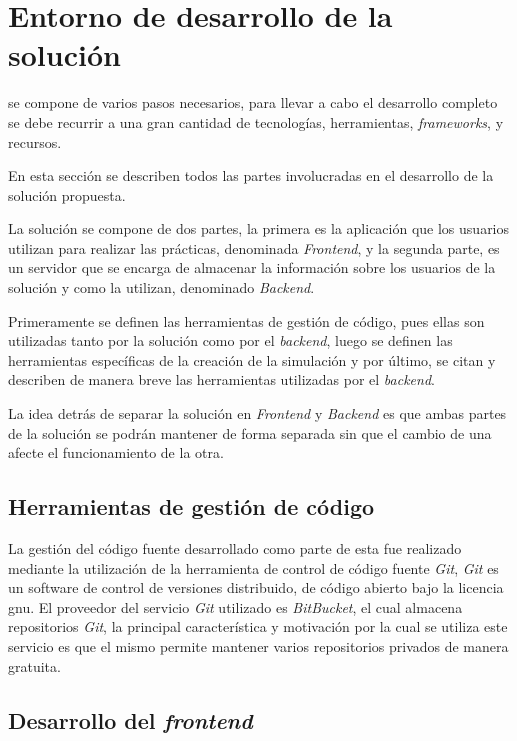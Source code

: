 \section{Entorno de desarrollo de la solución}

 se compone de varios pasos necesarios, para
llevar a cabo el desarrollo completo se debe recurrir a una gran cantidad de
tecnologías, herramientas, \textit{frameworks}, y recursos.

En esta sección se describen todos las partes involucradas en el desarrollo de
la solución propuesta. 

La solución se compone de dos partes, la primera es la aplicación que los
usuarios utilizan para realizar las prácticas, denominada \textit{Frontend}, y la segunda
parte, es un servidor que se encarga de almacenar la información sobre los
usuarios de la solución y como la utilizan, denominado \textit{Backend}.

Primeramente se definen las herramientas de gestión de código, pues ellas son
utilizadas tanto por la solución como por el \textit{backend}, luego se definen
las herramientas específicas de la creación de la simulación y por último, se
citan y describen de manera breve las herramientas utilizadas por el
\textit{backend}.

La idea detrás de separar la solución en \textit{Frontend} y \textit{Backend} 
es que ambas partes de la solución se podrán mantener de forma separada sin que 
el cambio de una afecte el funcionamiento de la otra. 

\subsection{Herramientas de gestión de código}

La gestión del código fuente desarrollado como parte de esta
 fue realizado
mediante la utilización de la herramienta de control de código fuente
\textit{Git}, \textit{Git} es un software de control de versiones distribuido,
de código abierto bajo la licencia \Gls{gnu}\cite{git}. El proveedor del
servicio \textit{Git} utilizado es \textit{BitBucket}\cite{bitbucket}, el cual
almacena repositorios \textit{Git}, la principal característica y motivación por
la cual se utiliza este servicio es que el mismo permite mantener varios
repositorios privados de manera gratuita\cite{bitbucket}.

\subsection{Desarrollo del \textit{frontend}}

